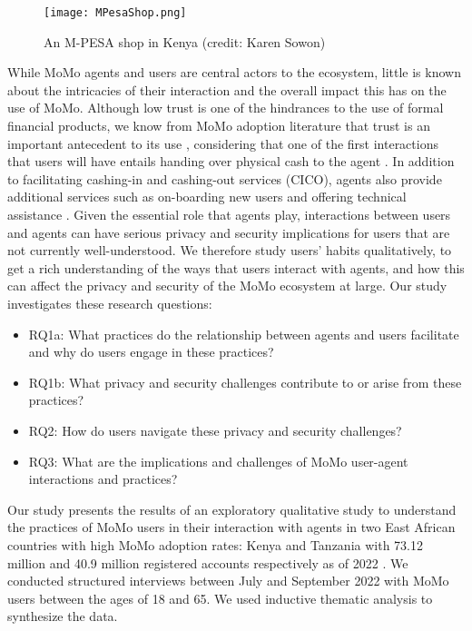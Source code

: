 \begin{figure}[htbp]
\texttt{[image: MPesaShop.png]}
\caption{An M-PESA shop in Kenya (credit: Karen Sowon)
}
\label{figAgent}
\end{figure}

While MoMo agents and users are central actors to the ecosystem, little is known about the intricacies of their interaction and the overall impact this has on the use of MoMo. Although low trust is one of the hindrances to the use of formal financial products, we know from MoMo adoption literature that trust is an important antecedent to its use \cite{noreen2021impact} \cite{okello2020trust} \cite{osakwe2022trust}, considering that one of the first interactions that users will have entails handing over physical cash to the agent \cite{davidson2011driving} \cite{naghavi2019state}. In addition to facilitating cashing-in and cashing-out services (CICO), agents also provide additional services such as on-boarding new users and offering technical assistance \cite{andersson2021state}. Given the essential role that agents play, interactions between users and agents can have serious privacy and security implications for users that are not currently well-understood. We therefore study users' habits qualitatively, to get a rich understanding of the ways that users interact with agents, and how this can affect the privacy and security of the MoMo ecosystem at large. Our study investigates these research questions:
\begin{itemize}
\item RQ1a: What practices do the relationship between agents and users facilitate and why do users engage in these practices? 
\item RQ1b: What privacy and security challenges contribute to or arise from these practices? 
\item RQ2: How do users navigate these privacy and security challenges? 
\item RQ3: What are the implications and challenges of MoMo user-agent interactions and practices? 
\end{itemize}
Our study presents the results of an exploratory qualitative study to understand the practices of MoMo users in their interaction with agents in two East African countries with high MoMo adoption rates: Kenya and Tanzania with 73.12 million and 40.9 million registered accounts respectively as of 2022  \cite{tcraquarterly2022}\cite{kenyamobilemoney}. 
We conducted structured interviews between July and September 2022 with MoMo users between the ages of 18 and 65. We used inductive thematic analysis to synthesize the data.

